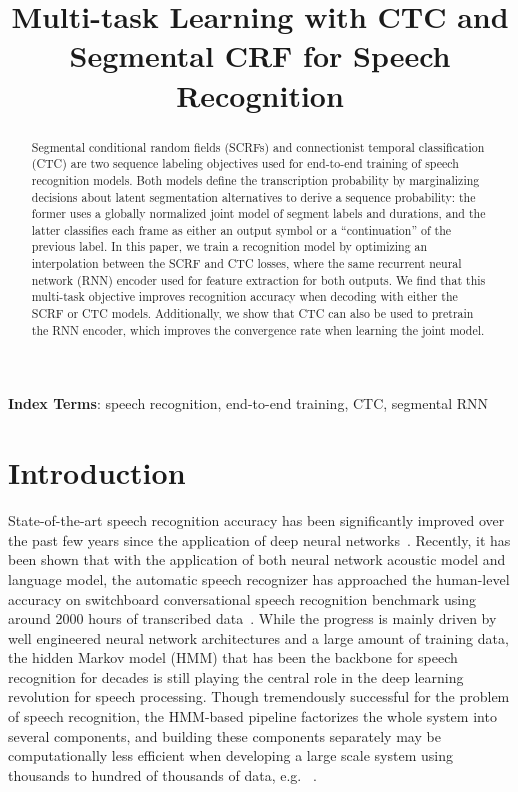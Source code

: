 \documentclass[a4paper]{article}
\title{Multi-task Learning with CTC and Segmental CRF for Speech Recognition}
\begin{document}
\maketitle
% 
\begin{abstract}
Segmental conditional random fields (SCRFs) and connectionist temporal classification (CTC) are two  sequence labeling objectives used for end-to-end training of speech recognition models. Both models define the transcription probability by marginalizing decisions about latent segmentation alternatives to derive a sequence probability: the former uses a globally normalized joint model of segment labels and durations, and the latter classifies each frame as either an output symbol or a ``continuation'' of the previous label.  In this paper, we train a recognition model by optimizing an interpolation between the SCRF and CTC losses, where the same recurrent neural network (RNN) encoder used for feature extraction for both outputs. We find that this multi-task objective improves recognition accuracy when decoding with either the SCRF or CTC models. Additionally, we show that CTC can also be used to pretrain the RNN encoder, which improves the convergence rate when learning the joint model. 
\end{abstract}
\noindent\textbf{Index Terms}: speech recognition, end-to-end training, CTC, segmental RNN

\section{Introduction}

State-of-the-art speech recognition accuracy has been significantly improved over the past few years since the application of deep neural networks~\cite{hinton2012deep, seide2011conversational}. Recently, it has been shown that with the application of both neural network acoustic model and language model, the automatic speech recognizer has approached the human-level accuracy on switchboard conversational speech recognition benchmark using around 2000 hours of transcribed data~\cite{xiong2016}. While the progress is mainly driven by well engineered neural network architectures and a large amount of training data, the hidden Markov model (HMM) that has been the backbone for speech recognition for decades is still playing the central role in the deep learning revolution for speech processing. Though tremendously successful for the problem of speech recognition, the HMM-based pipeline factorizes the whole system into several components, and building these components separately may be computationally less efficient when developing a large scale system using thousands to hundred of thousands of data, e.g. ~\cite{soltau2016neural}.
\end{document}
